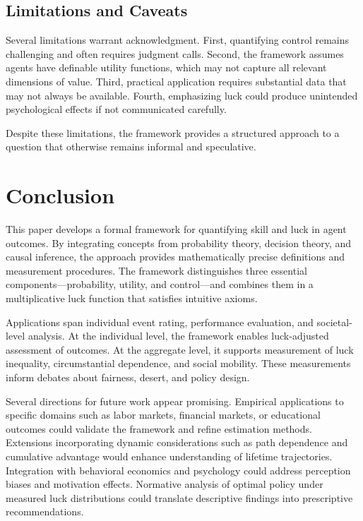   \subsection{Limitations and Caveats}

  Several limitations warrant acknowledgment. First, quantifying control
  remains challenging and often requires judgment calls. Second, the framework
  assumes agents have definable utility functions, which may not capture
  all relevant dimensions of value. Third, practical application
  requires substantial data that may not always be available. Fourth,
  emphasizing luck could produce unintended psychological effects if not
  communicated carefully.

  Despite these limitations, the framework provides a structured approach
  to a question that otherwise remains informal and speculative.

  \section{Conclusion}
  \label{sec:conclusion}

  This paper develops a formal framework for quantifying skill and luck
  in agent outcomes. By integrating concepts from probability theory,
  decision theory, and causal inference, the approach provides
  mathematically precise definitions and measurement procedures. The framework
  distinguishes three essential components—probability, utility, and control—and
  combines them in a multiplicative luck function that satisfies intuitive
  axioms.

  Applications span individual event rating, performance evaluation, and
  societal-level analysis. At the individual level, the framework enables
  luck-adjusted assessment of outcomes. At the aggregate level, it supports
  measurement of luck inequality, circumstantial dependence, and social mobility.
  These measurements inform debates about fairness, desert, and policy
  design.

  Several directions for future work appear promising. Empirical applications
  to specific domains such as labor markets, financial markets, or educational
  outcomes could validate the framework and refine estimation methods.
  Extensions incorporating dynamic considerations such as path
  dependence and cumulative advantage would enhance understanding of
  lifetime trajectories. Integration with behavioral economics and psychology
  could address perception biases and motivation effects. Normative
  analysis of optimal policy under measured luck distributions could
  translate descriptive findings into prescriptive recommendations.

